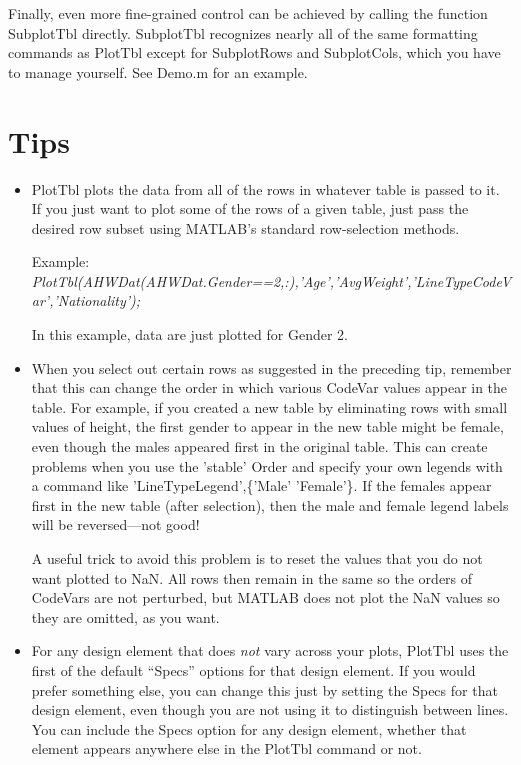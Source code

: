 \documentclass{article}
\newcommand{\example}[1]{Example: {\it #1}}
\begin{document}
Finally, even more fine-grained control can be achieved by calling the function SubplotTbl directly.
SubplotTbl recognizes nearly all of the same formatting commands as PlotTbl
except for SubplotRows and SubplotCols, which you have to manage yourself.
See Demo.m for an example.

\section{Tips}

\begin{itemize}

\item PlotTbl plots the data from all of the rows in whatever table is passed to it.
If you just want to plot some of the rows of a given table, just pass
the desired row subset using MATLAB's standard row-selection methods.

\example{PlotTbl(AHWDat(AHWDat.Gender==2,:),'Age','AvgWeight','LineTypeCodeVar','Nationality');} 

In this example, data are just plotted for Gender 2.

\item When you select out certain rows as suggested in the preceding tip, remember that
this can change the order in which various CodeVar values appear in the table.
For example, if you created a new table by eliminating rows with small values of height, the first gender
to appear in the new table might be female, even though the males appeared first in the original table.
This can create problems when you use the 'stable' Order and specify your own legends
with a command like 'LineTypeLegend',\{'Male' 'Female'\}.
If the females appear first in the new table (after selection), then the male and
female legend labels will be reversed---not good!

A useful trick to avoid this problem is to reset the values that you do not want plotted to NaN.
All rows then remain in the same so the orders of CodeVars are not perturbed,
but MATLAB does not plot the NaN values so they are omitted, as you want.



\item For any design element that does \emph{not} vary across your plots,
PlotTbl uses the first of the default ``Specs'' options for that design element.
If you would prefer something else, you can change this just by setting the Specs
for that design element, even though you are not using it to distinguish between lines.
You can include the Specs option for any design element, whether that element appears
anywhere else in the PlotTbl command or not.


\end{itemize}
\end{document}
